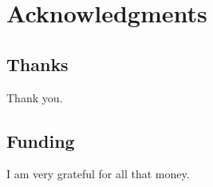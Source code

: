 \chapter*{Acknowledgments}



\section*{Thanks}

Thank you.



\section*{Funding}

I am very grateful for all that money.
